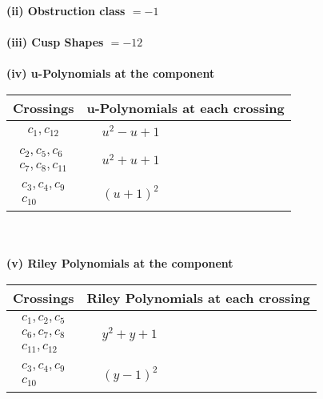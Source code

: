 \documentclass[1p]{elsarticle_modified}
\theoremstyle{definition}
\begin{document}
\flushleft \textbf{(ii) Obstruction class $= -1$}\\~\\
\flushleft \textbf{(iii) Cusp Shapes $= -12$}\\~\\
\newpage\renewcommand{\arraystretch}{1}
\flushleft \textbf{(iv) u-Polynomials at the component}\newline \\
\begin{tabular}{m{50pt}|m{274pt}}
Crossings & \hspace{64pt}u-Polynomials at each crossing \\
\hline $$\begin{aligned}c_{1},c_{12}\end{aligned}$$&$\begin{aligned}
&u^2- u+1
\end{aligned}$\\
\hline $$\begin{aligned}c_{2},c_{5},c_{6}\\c_{7},c_{8},c_{11}\end{aligned}$$&$\begin{aligned}
&u^2+u+1
\end{aligned}$\\
\hline $$\begin{aligned}c_{3},c_{4},c_{9}\\c_{10}\end{aligned}$$&$\begin{aligned}
&(u+1)^2
\end{aligned}$\\
\hline
\end{tabular}\\~\\
\newpage\renewcommand{\arraystretch}{1}
\flushleft \textbf{(v) Riley Polynomials at the component}\newline \\
\begin{tabular}{m{50pt}|m{274pt}}
Crossings & \hspace{64pt}Riley Polynomials at each crossing \\
\hline $$\begin{aligned}c_{1},c_{2},c_{5}\\c_{6},c_{7},c_{8}\\c_{11},c_{12}\end{aligned}$$&$\begin{aligned}
&y^2+y+1
\end{aligned}$\\
\hline $$\begin{aligned}c_{3},c_{4},c_{9}\\c_{10}\end{aligned}$$&$\begin{aligned}
&(y-1)^2
\end{aligned}$\\
\hline
\end{tabular}\\~\\
\end{document}
